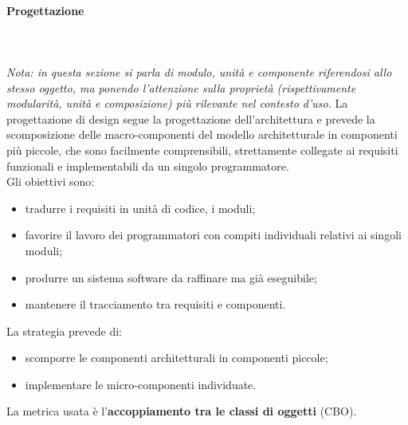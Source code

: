 \paragraph{Progettazione} \mbox{}\\ \mbox{}\\
\textit{Nota: in questa sezione si parla di modulo, unità e componente riferendosi allo stesso oggetto, ma ponendo l'attenzione sulla proprietà (rispettivamente modularità, unità e composizione) più rilevante nel contesto d'uso.}\newline 
La progettazione di design segue la progettazione dell'architettura e prevede la scomposizione delle macro-componenti del modello architetturale in componenti più piccole, che sono facilmente comprensibili, strettamente collegate ai requisiti funzionali e implementabili da un singolo programmatore.\\
Gli obiettivi sono:
\begin{itemize}
	\item tradurre i requisiti in unità di codice, i moduli;
	\item favorire il lavoro dei programmatori con compiti individuali relativi ai singoli moduli;
	\item produrre un sistema software da raffinare ma già eseguibile;
	\item mantenere il tracciamento tra requisiti e componenti.
\end{itemize}
La strategia prevede di: 
\begin{itemize}
	\item scomporre le componenti architetturali in componenti piccole;
	\item implementare le micro-componenti individuate.
\end{itemize}
La metrica usata è l'\textbf{accoppiamento tra le classi di oggetti} (CBO).

